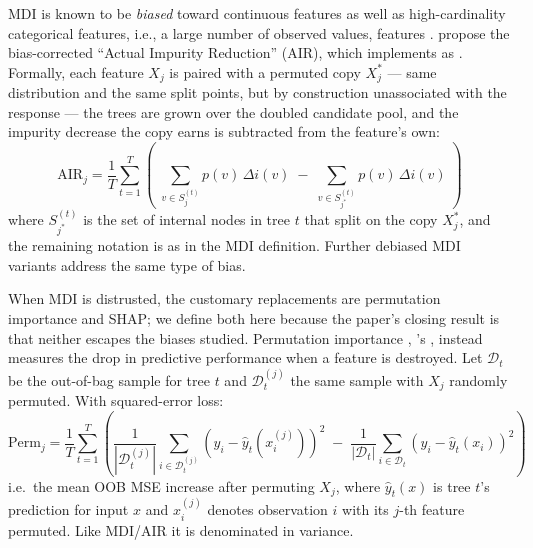 MDI is known to be
\emph{biased} toward continuous features as well as high-cardinality categorical
features, i.e.,
a large number of observed values,
features \citep{strobl2007,nembrini2018}. \citet{nembrini2018} propose the
bias-corrected ``Actual Impurity Reduction'' (AIR), which 
implements as . Formally, each feature $X_j$ is paired
with a
permuted copy $X_j^{*}$ --- same distribution and the same split points, but by
construction unassociated with the response --- the trees are grown over the
doubled candidate pool, and the impurity decrease the copy earns is subtracted
from the feature's own:
%
\begin{equation}
\text{AIR}_j = \frac{1}{T}\sum_{t=1}^{T}\left(\;\sum_{v \in S_j^{(t)}}
p(v)\,\Delta i(v) \;-\; \sum_{v \in S_{j^{*}}^{(t)}} p(v)\,\Delta i(v)\;\right)
\end{equation}
%
\noindent
where $S_{j^{*}}^{(t)}$ is the set of internal nodes in tree $t$ that split on
the copy $X_j^{*}$, and the remaining notation is as in the MDI definition.
Further debiased MDI variants \citep{li2019,zhou2021} address the same type of
bias.

When MDI is distrusted, the customary replacements are permutation importance
and SHAP; we define both here because the paper's closing result is that neither
escapes the biases studied.
Permutation importance \citep{breiman2001}, 's
, instead measures the drop in
predictive performance when a feature is destroyed. Let
$\mathcal{D}_t$ be the out-of-bag sample for tree $t$ and
$\mathcal{D}_t^{(j)}$ the same sample with $X_j$ randomly permuted.
With squared-error loss:
%
\begin{equation}
\text{Perm}_j = \frac{1}{T}\sum_{t=1}^{T}\left(
  \frac{1}{|\mathcal{D}_t^{(j)}|}\sum_{i \in \mathcal{D}_t^{(j)}}
    (y_i - \hat{y}_t(x_i^{(j)}))^2 \;-\;
  \frac{1}{|\mathcal{D}_t|}\sum_{i \in \mathcal{D}_t}
    (y_i - \hat{y}_t(x_i))^2 \right)
\end{equation}
%
\noindent
i.e.\ the mean OOB MSE increase after permuting $X_j$, where
$\hat y_t(x)$ is tree $t$'s prediction for input $x$ and
$x_i^{(j)}$ denotes observation $i$ with its $j$-th feature permuted.
Like MDI/AIR it is denominated in variance.


